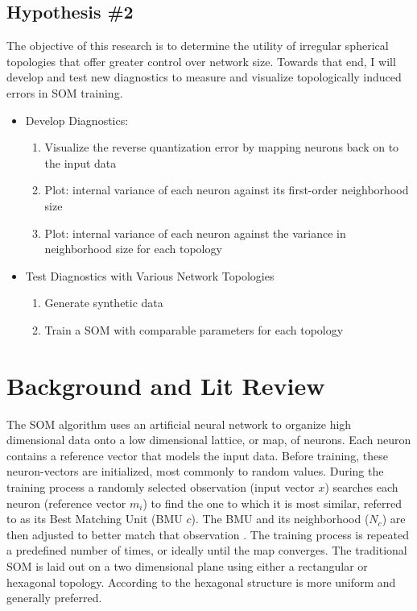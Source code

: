 \documentclass[10pt,titlepage]{article}
\begin{document}
\subsection{Hypothesis \#2}

The objective of this research is to determine the utility of irregular
spherical topologies that offer greater control over network size. Towards that
end, I will develop and test new diagnostics to measure and visualize
topologically induced errors in SOM training.

\begin{itemize}
	\item Develop Diagnostics:
	\begin{enumerate}
		\item Visualize the reverse quantization error by mapping neurons back on to the input data
    		\item Plot: internal variance of each neuron against its first-order neighborhood size
		\item Plot: internal variance of each neuron against the variance in neighborhood size for each topology
	\end{enumerate}
	\item Test Diagnostics with Various Network Topologies
	\begin{enumerate}
    		\item Generate synthetic data
    		\item Train a SOM with comparable parameters for each topology
	\end{enumerate}
\end{itemize}

\section{Background and Lit Review}
The SOM algorithm uses an artificial neural network to organize high dimensional
data onto a low dimensional lattice, or map, of neurons.  Each neuron contains a
reference vector that models the input data.  Before training, these
neuron-vectors are initialized, most commonly to random values.  During the
training process a randomly selected observation (input vector $x$) searches
each neuron (reference vector $m_i$) to find the one to which it is most
similar, referred to as its Best Matching Unit (BMU $c$).  The BMU and its
neighborhood ($N_c$) are then adjusted to better match that observation
\citep{Kohonen2000}.  The training process is repeated a predefined number of
times, or ideally until the map converges.  The traditional SOM is laid out on a
two dimensional plane using either a rectangular or hexagonal topology.
According to \cite{wu2006} the hexagonal structure is more uniform and generally
preferred.
\end{document}
